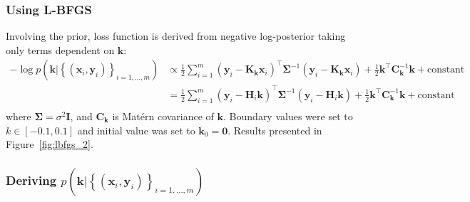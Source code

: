 \documentclass[times, a4paper, 12pt, onecolumn, oneside]{article}
\newcommand{\bm}{\boldsymbol}
\begin{document}
\subsubsection{Using L-BFGS}

Involving the prior, loss function is derived from negative log-posterior taking only terms dependent on $\bm{k}$:
$$
\begin{aligned}
-\log p(\bm{k} | \left\{(\bm{x}_i, \bm{y}_i)\right\}_{i=1,...,m}) &\propto \frac{1}{2} \sum_{i=1}^m (\bm{y}_i - \bm{K}_{\bm{k}} \bm{x}_i)^\intercal \bm{\Sigma}^{-1}(\bm{y}_i - \bm{K}_{\bm{k}} \bm{x}_i) + \frac{1}{2} \bm{k}^\intercal \bm{C}^{-1}_{\bm{k}} \bm{k} + \text{constant} \\
&= \frac{1}{2} \sum_{i=1}^m (\bm{y}_i - \bm{H}_i\bm{k})^\intercal \bm{\Sigma}^{-1}(\bm{y}_i - \bm{H}_i \bm{k}) + \frac{1}{2} \bm{k}^\intercal \bm{C}_{\bm{k}}^{-1} \bm{k} + \text{constant} \\
\end{aligned}
$$
where $\bm{\Sigma} = \sigma^2 \bm{I}$, and $\bm{C}_{\bm{k}}$ is Matérn covariance of $\bm{k}$.
Boundary values were set to $k \in [-0.1, 0.1]$ and initial value was set to $\bm{k}_0 = \bm{0}$.
Results presented in Figure~\ref{fig:lbfgs_2}.

\subsubsection{Deriving $p(\bm{k} | \left\{(\bm{x}_i, \bm{y}_i)\right\}_{i=1,...,m})$}
\end{document}
